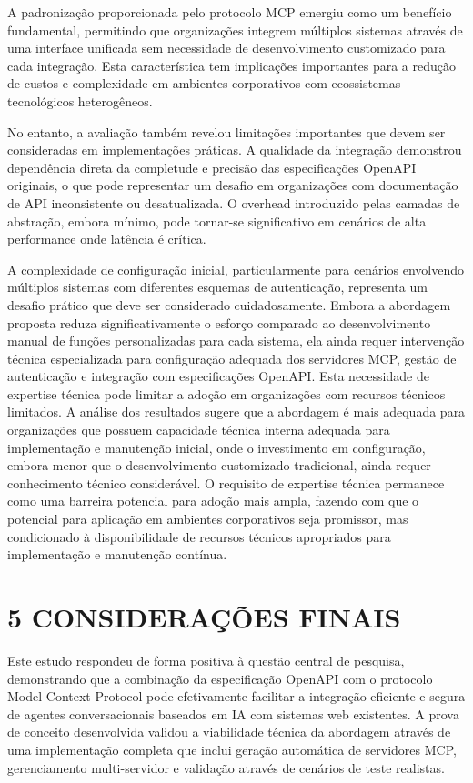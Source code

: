\documentclass[
]{article}
\begin{document}
A padronização proporcionada pelo protocolo MCP emergiu como um
benefício fundamental, permitindo que organizações integrem múltiplos
sistemas através de uma interface unificada sem necessidade de
desenvolvimento customizado para cada integração. Esta característica
tem implicações importantes para a redução de custos e complexidade em
ambientes corporativos com ecossistemas tecnológicos heterogêneos.

No entanto, a avaliação também revelou limitações importantes que devem
ser consideradas em implementações práticas. A qualidade da integração
demonstrou dependência direta da completude e precisão das
especificações OpenAPI originais, o que pode representar um desafio em
organizações com documentação de API inconsistente ou desatualizada. O
overhead introduzido pelas camadas de abstração, embora mínimo, pode
tornar-se significativo em cenários de alta performance onde latência é
crítica.

A complexidade de configuração inicial, particularmente para cenários
envolvendo múltiplos sistemas com diferentes esquemas de autenticação,
representa um desafio prático que deve ser considerado cuidadosamente.
Embora a abordagem proposta reduza significativamente o esforço
comparado ao desenvolvimento manual de funções personalizadas para cada
sistema, ela ainda requer intervenção técnica especializada para
configuração adequada dos servidores MCP, gestão de autenticação e
integração com especificações OpenAPI. Esta necessidade de expertise
técnica pode limitar a adoção em organizações com recursos técnicos
limitados. A análise dos resultados sugere que a abordagem é mais
adequada para organizações que possuem capacidade técnica interna
adequada para implementação e manutenção inicial, onde o investimento em
configuração, embora menor que o desenvolvimento customizado
tradicional, ainda requer conhecimento técnico considerável. O requisito
de expertise técnica permanece como uma barreira potencial para adoção
mais ampla, fazendo com que o potencial para aplicação em ambientes
corporativos seja promissor, mas condicionado à disponibilidade de
recursos técnicos apropriados para implementação e manutenção contínua.

\section{5 CONSIDERAÇÕES FINAIS}\label{considerauxe7uxf5es-finais}

Este estudo respondeu de forma positiva à questão central de pesquisa,
demonstrando que a combinação da especificação OpenAPI com o protocolo
Model Context Protocol pode efetivamente facilitar a integração
eficiente e segura de agentes conversacionais baseados em IA com
sistemas web existentes. A prova de conceito desenvolvida validou a
viabilidade técnica da abordagem através de uma implementação completa
que inclui geração automática de servidores MCP, gerenciamento
multi-servidor e validação através de cenários de teste realistas.
\end{document}
